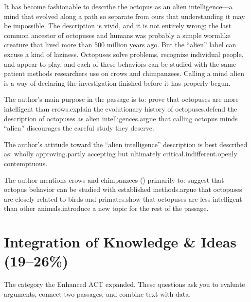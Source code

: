 \documentclass[11pt]{article}
\begin{document}
\begin{passage}
It has become fashionable to describe the octopus as an alien intelligence---a mind that evolved along a path so separate from ours that understanding it may be impossible. The description is vivid, and it is not entirely wrong; the last common ancestor of octopuses and humans was probably a simple wormlike creature that lived more than 500 million years ago. But the ``alien'' label can excuse a kind of laziness. Octopuses solve problems, recognize individual people, and appear to play, and each of these behaviors can be studied with the same patient methods researchers use on crows and chimpanzees. Calling a mind alien is a way of declaring the investigation finished before it has properly begun.
\end{passage}

{The author's main purpose in the passage is to:}
{prove that octopuses are more intelligent than crows.}{explain the evolutionary history of octopuses.}{defend the description of octopuses as alien intelligences.}{argue that calling octopus minds ``alien'' discourages the careful study they deserve.}

{The author's attitude toward the ``alien intelligence'' description is best described as:}
{wholly approving.}{partly accepting but ultimately critical.}{indifferent.}{openly contemptuous.}

{The author mentions crows and chimpanzees () primarily to:}
{suggest that octopus behavior can be studied with established methods.}{argue that octopuses are closely related to birds and primates.}{show that octopuses are less intelligent than other animals.}{introduce a new topic for the rest of the passage.}

\section{Integration of Knowledge \& Ideas (19--26\%)}
The category the Enhanced ACT expanded. These questions ask you to evaluate arguments, connect two passages, and combine text with data.
\end{document}

